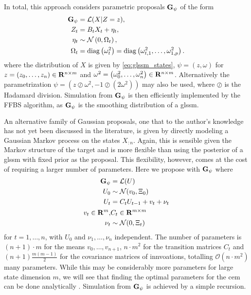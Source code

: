 In total, this approach considers parametric proposals $\mathbf G_{\psi}$ of the form
\begin{align}
    \label{eq:glssm-proposal}
    \mathbf G_{\psi} &= \mathcal L(X | Z = z),\\
    Z_{t} &= B_{t} X_{t} + \eta_{t},\nonumber\\
    \eta_{t} &\sim \mathcal N \left( 0, \Omega_{t} \right),\nonumber\\
    \Omega_{t} &= \operatorname{diag} \left( \omega^{2}_{t} \right) = \operatorname{diag} \left( \omega^{2}_{t,1}, \dots, \omega^{2}_{1,p} \right).\nonumber
\end{align}
where the distribution of $X$ is given by \eqref{eq:glssm_states}, $\psi = \left( z, \omega \right)$ for $z = \left( z_{0}, \dots, z_{n} \right) \in \mathbf R^{n \times m}$ and $\omega^{2} = \left( \omega^{2}_{0}, \dots, \omega^{2}_{n} \right) \in \mathbf R^{n \times m}$. Alternatively the parametrization $\psi = \left( z \oslash \omega^{2}, - 1 \oslash \left( 2 \omega^{2} \right) \right)$ may also be used, where $\oslash$ is the Hadamard division. Simulation from $\mathbf G_{\psi}$ is then efficiently implemented by the FFBS algorithm, as $\mathbf G_{\psi}$ is the smoothing distribution of a \gls{glssm}. 

An alternative family of Gaussian proposals, one that to the author's knowledge has not yet been discussed in the literature, is given by directly modeling a Gaussian Markov process on the states $X_{:n}$. Again, this is sensible given the Markov structure of the target and is more flexible than using the posterior of a \gls{glssm} with fixed prior as the proposal. This flexibility, however, comes at the cost of requiring a larger number of parameters. Here we propose with $\mathbf G_{\psi}$ where
\begin{align}
    \label{eq:markov-proposal}
    \mathbf G_{\psi} &= \mathcal L (U) \\
    U_{0} &\sim \mathcal N(v_{0}, \Xi_{0})\nonumber\\
    U_{t} &= C_{t}U_{t - 1} + v_{t} + \nu_{t} \nonumber\\
    v_{t} \in \mathbf R^{m}\nonumber, &C_{t} \in \mathbf R^{m\times m}\\
    \nu_{t} &\sim \mathcal N(0,\Xi_{t}) \nonumber
\end{align}
for $t = 1, \dots, n$, with $U_{0}$ and $\nu_{1}, \dots, \nu_{n}$ independent. The number of parameters is $(n + 1)\cdot m$ for the means $v_{0}, \dots, v_{n + 1}$, $n \cdot m^{2}$ for the transition matrices $C_{t}$ and $(n + 1) \frac{m (m - 1)}{2}$ for the covariance matrices of innvoations, totalling $\mathcal O(n\cdot m^{2})$ many parameters. 
While this may be considerably more parameters for large state dimension $m$, we will see that finding the optimal parameters for the \gls{cem} can be done analytically . Simulation from $\mathbf G_{\psi}$ is achieved by a simple recursion. 

